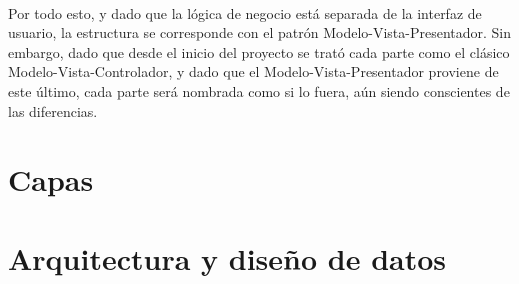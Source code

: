 \documentclass{subfiles}
\begin{document}
        \paragraph{}
        Por todo esto, y dado que la lógica de negocio está separada de la interfaz de usuario, la estructura se corresponde con el patrón Modelo-Vista-Presentador. Sin embargo, dado que desde el inicio del proyecto se trató cada parte como el clásico Modelo-Vista-Controlador, y dado que el Modelo-Vista-Presentador proviene de este último, cada parte será nombrada como si lo fuera, aún siendo conscientes de las diferencias.

        \section{Capas}
        \label{sec:capas}

        \section{Arquitectura y diseño de datos}
        \label{sec:arquitectura_y_diseno_de_datos}
\end{document}
